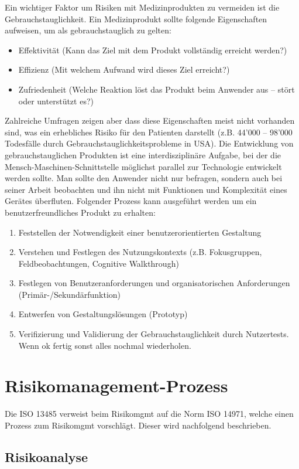 Ein wichtiger Faktor um Risiken mit Medizinprodukten zu vermeiden ist die Gebrauchstauglichkeit. Ein Medizinprodukt sollte folgende Eigenschaften aufweisen, um als gebrauchstauglich zu gelten:
\begin{itemize}
	\item Effektivität (Kann das Ziel mit dem Produkt vollständig erreicht werden?)
	\item Effizienz	(Mit welchem Aufwand wird dieses Ziel erreicht?)
	\item Zufriedenheit	(Welche Reaktion löst das Produkt beim Anwender aus – stört oder unterstützt es?)
\end{itemize}
Zahlreiche Umfragen zeigen aber dass diese Eigenschaften meist nicht vorhanden sind, was ein erhebliches Risiko für den Patienten darstellt (z.B. 44'000 – 98'000 Todesfälle durch Gebrauchstauglichkeitsprobleme in USA). Die Entwicklung von gebrauchstauglichen Produkten ist eine interdisziplinäre Aufgabe, bei der die Mensch-Maschinen-Schnittstelle möglichst parallel zur Technologie entwickelt werden sollte. Man sollte den Anwender nicht nur befragen, sondern auch bei seiner Arbeit beobachten und ihn nicht mit Funktionen und Komplexität eines Gerätes überfluten. Folgender Prozess kann ausgeführt werden um ein benutzerfreundliches Produkt zu erhalten:
\begin{enumerate}
	\item Feststellen der Notwendigkeit einer benutzerorientierten Gestaltung
	\item Verstehen und Festlegen des Nutzungskontexts (z.B. Fokusgruppen, Feldbeobachtungen, Cognitive Walkthrough)
	\item Festlegen von Benutzeranforderungen und organisatorischen Anforderungen (Primär-/Sekundärfunktion)
	\item Entwerfen von Gestaltungslösungen (Prototyp)
	\item Verifizierung und Validierung	der Gebrauchstauglichkeit durch Nutzertests. Wenn ok fertig sonst alles nochmal wiederholen.
\end{enumerate}

\section{Risikomanagement-Prozess}

Die ISO 13485 verweist beim Risikomgmt auf die Norm ISO 14971, welche einen Prozess zum Risikomgmt vorschlägt. Dieser wird nachfolgend beschrieben.

\subsection{Risikoanalyse}

